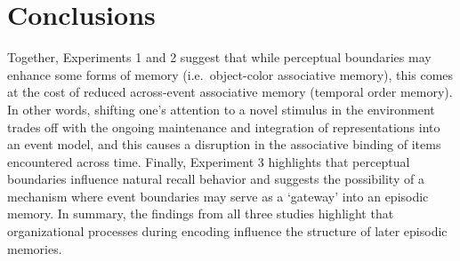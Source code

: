 \section{Conclusions}\label{conclusions}

Together, Experiments 1 and 2 suggest that while perceptual boundaries
may enhance some forms of memory (i.e.~object-color associative memory),
this comes at the cost of reduced across-event associative memory
(temporal order memory). In other words, shifting one's attention to a
novel stimulus in the environment trades off with the ongoing
maintenance and integration of representations into an event model, and
this causes a disruption in the associative binding of items encountered
across time. Finally, Experiment 3 highlights that perceptual boundaries
influence natural recall behavior and suggests the possibility of a
mechanism where event boundaries may serve as a `gateway' into an
episodic memory. In summary, the findings from all three studies
highlight that organizational processes during encoding influence the
structure of later episodic memories.
